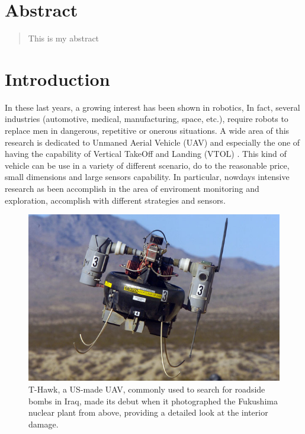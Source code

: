 \documentclass[11pt, a4paper, onecolumn, fleqn, twoside, titlepage, openright]{book}
\begin{document}
	\chapter*{Abstract}
	\label{abstract}

	\begin{quote}
		This is my abstract
	\end{quote}


	\tableofcontents	


	\chapter{Introduction}
	\label{introduction}

	In these last years, a growing interest has been shown in robotics, In fact, several industries (automotive, medical, manufacturing, space, etc.), require robots to replace men in dangerous, repetitive or onerous situations. A wide area of this research is dedicated to Unmaned Aerial Vehicle (UAV) and especially the one of having the capability of Vertical TakeOff and Landing (VTOL) \cite{modelIdentification}. This kind of vehicle can be use in a variety of different scenario, do to the reasonable price, small dimensions and large sensors capability. In particular, nowdays intensive research as been accomplish in the area of enviroment monitoring and exploration, accomplish with different strategies and sensors.

	\begin{figure}
		\includegraphics[scale=0.4]{images/fukushima.jpg}
		\caption{T-Hawk, a US-made UAV, commonly used to search for roadside bombs in Iraq, made its debut when it photographed the Fukushima nuclear plant from above, providing a detailed look at the interior damage.}
		\label{fig:application}
	\end{figure}  
\end{document}
